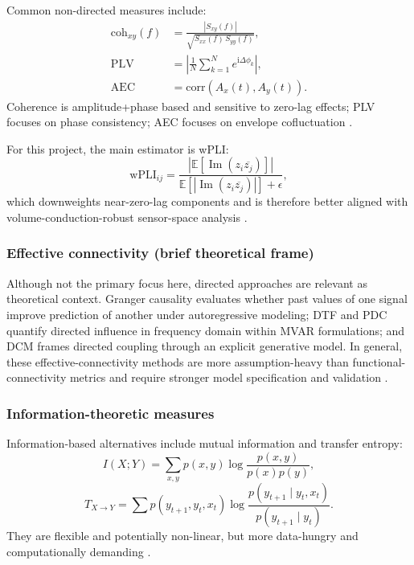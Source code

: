 Common non-directed measures include:
\begin{align*}
\mathrm{coh}_{xy}(f) &= \frac{|S_{xy}(f)|}{\sqrt{S_{xx}(f)\,S_{yy}(f)}},\\
\mathrm{PLV} &= \left|\frac{1}{N}\sum_{k=1}^{N} e^{\mathrm{i}\Delta\phi_k}\right|,\\
\mathrm{AEC} &= \mathrm{corr}(A_x(t),A_y(t)).
\end{align*}
Coherence is amplitude+phase based and sensitive to zero-lag effects; PLV focuses on phase consistency; AEC focuses on envelope cofluctuation \citep{Cohen2014,Vinck2011WPLI,Cao2022EEGConnectivity}.

For this project, the main estimator is wPLI:
\[
\mathrm{wPLI}_{ij}
=
\frac{\left|\mathbb{E}\left[\operatorname{Im}(z_i\overline{z_j})\right]\right|}
{\mathbb{E}\left[\left|\operatorname{Im}(z_i\overline{z_j})\right|\right]+\epsilon},
\]
which downweights near-zero-lag components and is therefore better aligned with volume-conduction-robust sensor-space analysis \citep{Vinck2011WPLI}.

\subsubsection{Effective connectivity (brief theoretical frame)}

Although not the primary focus here, directed approaches are relevant as theoretical context. Granger causality evaluates whether past values of one signal improve prediction of another under autoregressive modeling; DTF and PDC quantify directed influence in frequency domain within MVAR formulations; and DCM frames directed coupling through an explicit generative model. In general, these effective-connectivity methods are more assumption-heavy than functional-connectivity metrics and require stronger model specification and validation \citep{Cohen2014,Sanei2022}.

\subsubsection{Information-theoretic measures}

Information-based alternatives include mutual information and transfer entropy:
\[
I(X;Y)=\sum_{x,y}p(x,y)\log\frac{p(x,y)}{p(x)p(y)},
\]
\[
T_{X\to Y}=\sum p(y_{t+1},y_t,x_t)\log\frac{p(y_{t+1}\mid y_t,x_t)}{p(y_{t+1}\mid y_t)}.
\]
They are flexible and potentially non-linear, but more data-hungry and computationally demanding \citep{Blinowska-Cieslak2022,Cohen2014}.

